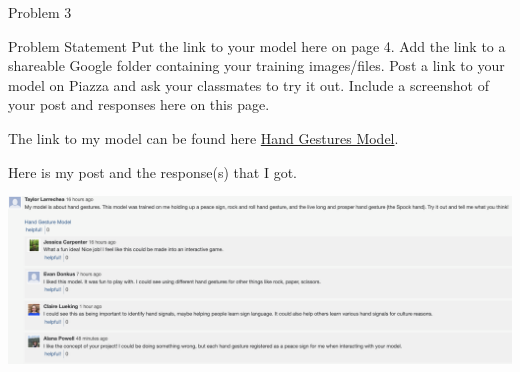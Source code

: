 \begin{problem}{Problem 3}
    \begin{statement}{Problem Statement}
        Put the link to your model here on page 4. Add the link to a shareable Google folder containing your training images/files. Post a link to your model on Piazza and ask your classmates to try 
        it out. Include a screenshot of your post and responses here on this page.
    \end{statement}

    \begin{highlight}[Solution]
        The link to my model can be found here \href{https://teachablemachine.withgoogle.com/models/dkkzS5pWK/}{Hand Gestures Model}. \vspace*{1em}

        Here is my post and the response(s) that I got.

        \begin{center}
            \includegraphics[width = 1.0\textwidth]{./Images/Piazza/Responses.png}
        \end{center}
    \end{highlight}
\end{problem}

